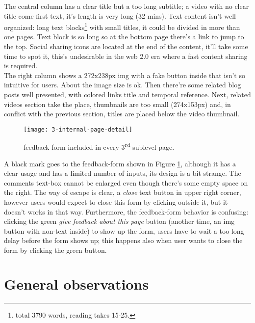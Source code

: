\documentclass[
10pt, %
a4paper, %
oneside, %
headinclude,footinclude, %
BCOR5mm, %
]{scrartcl}
\begin{document}
	The central column has a clear title but a too long subtitle; a video with no clear title come first text, it's length is very long (32 mins). Text content isn't well organized: long text blocks\footnote{total 3790 words, reading takes 15-25.} with small titles, it could be divided in more than one pages. Text block is so long so at the bottom page there's a link to jump to the top. Social sharing icons are located at the end of the content, it'll take some time to spot it, this's undesirable in the web 2.0 era where a fast content sharing is required. \\
	The right column shows a 272x238px img with a fake button inside that isn't so intuitive for users. About the image size is ok. Then there're some related blog posts well presented, with colored links title and temporal reference. Next, related videos section take the place, thumbnails are too small (274x153px) and, in conflict with the previous section, titles are placed below the video thumbnail.
	
	\begin{figure}[h!]
	\centering 
	\centerline{\texttt{[image: 3-internal-page-detail]}}
	\caption[feedback-form]{feedback-form included in every 3\textsuperscript{rd} sublevel page.}
	\label{fig:terzapaginainternadettaglio} 
	\end{figure}

	A black mark goes to the feedback-form shown in Figure \ref{fig:terzapaginainternadettaglio}, although it has a clear usage and has a limited number of inputs, its design is a bit strange. The comments text-box cannot be enlarged even though there's some empty space on the right. The way of escape is clear, a \emph{close} text button in upper right corner, however users would expect to close this form by clicking outside it, but it doesn't works in that way. Furthermore, the feedback-form behavior is confusing: clicking the green \emph{give feedback about this page} button (another time, an img button with non-text inside) to show up the form, users have to wait a too long delay before the form shows up; this happens also when user wants to close the form by clicking the green button.


\newpage
\section{General observations}
\end{document}
